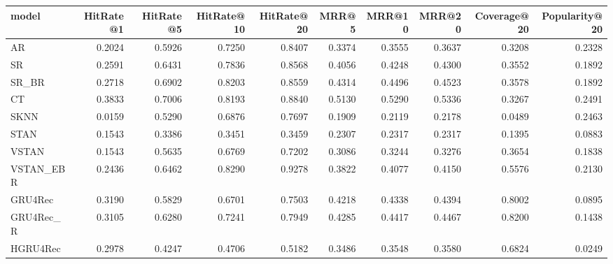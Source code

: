 \begin{tabular}{lrrrrrrrrr}
\toprule
     model &  HitRate@1 &  HitRate@5 &  HitRate@10 &  HitRate@20 &   MRR@5 &  MRR@10 &  MRR@20 &  Coverage@20 &  Popularity@20 \\
\midrule
        AR &     0.2024 &     0.5926 &      0.7250 &      0.8407 &  0.3374 &  0.3555 &  0.3637 &       0.3208 &         0.2328 \\
        SR &     0.2591 &     0.6431 &      0.7836 &      0.8568 &  0.4056 &  0.4248 &  0.4300 &       0.3552 &         0.1892 \\
     SR\_BR &     0.2718 &     0.6902 &      0.8203 &      0.8559 &  0.4314 &  0.4496 &  0.4523 &       0.3578 &         0.1892 \\
        CT &     0.3833 &     0.7006 &      0.8193 &      0.8840 &  0.5130 &  0.5290 &  0.5336 &       0.3267 &         0.2491 \\
      SKNN &     0.0159 &     0.5290 &      0.6876 &      0.7697 &  0.1909 &  0.2119 &  0.2178 &       0.0489 &         0.2463 \\
      STAN &     0.1543 &     0.3386 &      0.3451 &      0.3459 &  0.2307 &  0.2317 &  0.2317 &       0.1395 &         0.0883 \\
     VSTAN &     0.1543 &     0.5635 &      0.6769 &      0.7202 &  0.3086 &  0.3244 &  0.3276 &       0.3654 &         0.1838 \\
 VSTAN\_EBR &     0.2436 &     0.6462 &      0.8290 &      0.9278 &  0.3822 &  0.4077 &  0.4150 &       0.5576 &         0.2130 \\
   GRU4Rec &     0.3190 &     0.5829 &      0.6701 &      0.7503 &  0.4218 &  0.4338 &  0.4394 &       0.8002 &         0.0895 \\
 GRU4Rec\_R &     0.3105 &     0.6280 &      0.7241 &      0.7949 &  0.4285 &  0.4417 &  0.4467 &       0.8200 &         0.1438 \\
  HGRU4Rec &     0.2978 &     0.4247 &      0.4706 &      0.5182 &  0.3486 &  0.3548 &  0.3580 &       0.6824 &         0.0249 \\
\bottomrule
\end{tabular}
